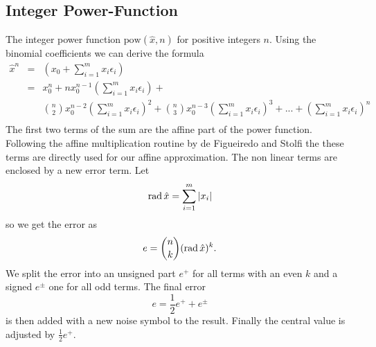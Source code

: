 \documentclass[a4]{scrartcl}
\newcommand{\iv}[2]{\ensuremath{[#1, #2]}\xspace}
\newcommand{\aff}[1]{\ensuremath{\hat{#1}}\xspace}
\newcommand{\pow}[0]{\ensuremath{\mathrm{pow}}\xspace}
\begin{document}
\subsection{Integer Power-Function}
\label{sec:integ-power-funct}
The integer power function $\pow(\aff x, n)$ for positive integers $n$. Using
the binomial coefficients we can derive the formula
\[
\begin{array}{lll}
  \aff{x}^n &=& \left ( x_0 + \sum \limits_{i=1}^m x_i\epsilon_i
  \right )\\
  & =& x_0^n + nx_0^{n-1} \left ( \sum \limits_{i=1}^mx_i\epsilon_i \right )+\\
  &&
  {n \choose 2}x_0^{n-2} \left (\sum \limits_{i=1}^m x_i\epsilon_i \right )^2 + {n \choose
    3}x_0^{n-3} \left (\sum \limits_{i=1}^m x_i\epsilon_i \right )^3 + ... +
  \left( \sum \limits_{i=1}^m x_i\epsilon_i \right )^n\\
\end{array}
\]
The first two terms of the sum are the affine part of the power function.
Following the affine multiplication routine by de Figueiredo and Stolfi
\cite{stolfi1997} the these terms are directly used for our affine
approximation. The non linear terms are enclosed by a new error term.
Let
\[
\rad \aff x = \sum \limits_{i=1}^m |x_i|
\]
so we get the error as
\[
e = {n \choose k} (\rad \aff x)^k .
\]
We split the error into an unsigned part $e^+$ for all terms with an even $k$
and a signed $e^\pm$ one for all odd terms. The final error
\[
e = \frac 1 2 e^+ + e^\pm
\]
is then added with a new noise symbol to the result. Finally the central value
is adjusted by $\frac 1 2 e^+$. 


\end{document}
